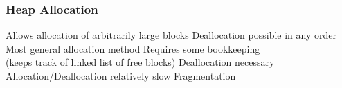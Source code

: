 \begin{frame}
  \frametitle{Heap Allocation}
  \begin{procontralist}
    \pro Allows allocation of arbitrarily large blocks
    \pro Deallocation possible in any order
    \pro Most general allocation method
    \con Requires some bookkeeping \\ (keeps track of linked list of free blocks)
    \con Deallocation necessary
    \con Allocation/Deallocation relatively slow
    \con Fragmentation
  \end{procontralist}
\end{frame}


